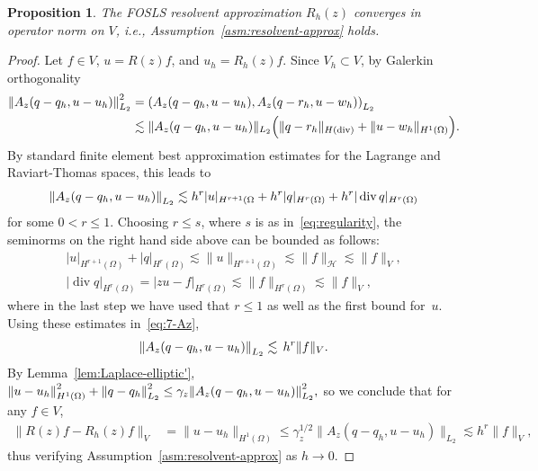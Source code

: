 \documentclass[12pt, oneside, reqno]{amsart}
\newtheorem{proposition}[theorem]{Proposition}
\theoremstyle{remark}
\DeclareMathOperator{\diver}{div}
\DeclarePairedDelimiter{\norm}{\lVert}{\rVert}
\newcommand{\Af}{{A}}
\newcommand{\Hc}{\mathcal{H}}
\newcommand{\om}{\Omega}
\begin{document}
\begin{proposition}
  The FOSLS resolvent approximation $R_h(z)$ converges in operator norm on $V$,
  i.e., Assumption~\ref{asm:resolvent-approx} holds.
\end{proposition}
\begin{proof}
  Let $f \in V$,  $u = R(z) f$,  and $u_h = R_h(z) f$.
  Since $V_h \subset V$, by Galerkin orthogonality
  \begin{align*}
    \norm*{\Af_z (q - q_h, u - u_h)}_{L_2}^2
    & =
      \left(
      \Af_z(q - q_h, u - u_h), \Af_z(q - r_h, u - w_h)
      \right)_{L_2}
    \\
    & \lesssim
      \| \Af_z(q - q_h, u - u_h)\|_{L_2}
      \Big(
      \| q - r_h \|_{H(\diver)}  + \| u - w_h \|_{H^1(\om)} 
      \Big).
  \end{align*}
  By standard finite element best approximation estimates for the Lagrange
  and Raviart-Thomas spaces, this leads to 
  \begin{equation}    
    \label{eq:7-Az}
    \norm*{\Af_z (q - q_h, u - u_h)}_{L_2}
    \lesssim h^r |u |_{H^{r+1}(\om} + h^r |q|_{H^r(\om)} + h^r | \diver q |_{H^r(\om)}
  \end{equation}
  for some $0 < r \le 1$. Choosing $r\le s$, where $s$ is as
  in~\eqref{eq:regularity}, the seminorms on the right hand side above can
  be bounded as follows:
  \begin{gather*}
    |u|_{H^{r+1}(\om)} + |q|_{H^{r}(\om)}
    \lesssim \| u \|_{H^{s+1}(\om)} \lesssim
      \| f \|_{\Hc} \lesssim \| f \|_V,
    \\
    |\diver q|_{H^{r}(\om)}
    = |z u  - f|_{H^r(\om)} \lesssim \| f \|_{H^r(\om)} \lesssim \| f \|_V,
  \end{gather*}
  where in the last step we have used that $r \le 1$ as well as the
  first bound for~$u$.  Using these estimates in~\eqref{eq:7-Az},
  \[
    \norm*{\Af_z (q - q_h, u - u_h)}_{L_2}
    \lesssim\, h^r \| f \|_V.
  \]
  By Lemma~\ref{lem:Laplace-elliptic'},
  $    \norm*{u - u_h}_{H^1(\Omega)}^2
  + \norm*{q - q_h}_{L_2}^2
  \leq
  \gamma_z \norm*{\Af_z (q - q_h, u - u_h)}_{L_2}^2,
  $
  so we conclude that for any $f \in V$, 
  \begin{align}
    \label{eq:8}
    \| R(z) f - R_h(z) f\|_V
    & = \| u - u_h \|_{H^1(\om)}
      \le \gamma_z^{1/2} \| \Af_z( q - q_h, u - u_h) \|_{L_2} 
      \lesssim h^r \| f \|_V,    
  \end{align}
  thus verifying Assumption~\ref{asm:resolvent-approx} as $h \to 0$. 
\end{proof}
\end{document}
